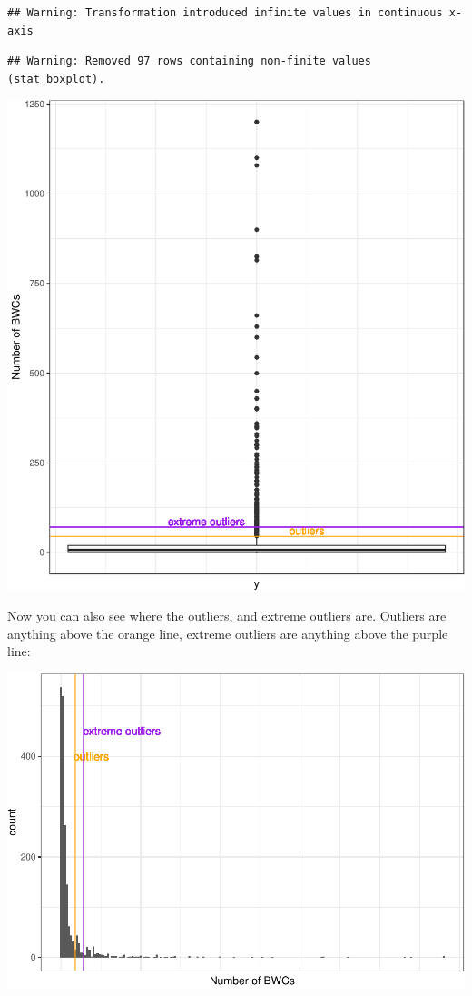 \documentclass[
]{book}
\begin{document}
\begin{verbatim}
## Warning: Transformation introduced infinite values in continuous x-axis
\end{verbatim}

\begin{verbatim}
## Warning: Removed 97 rows containing non-finite values (stat_boxplot).
\end{verbatim}

\includegraphics{04-descriptive-statistics_files/figure-latex/unnamed-chunk-29-1.pdf}

Now you can also see where the outliers, and extreme outliers are. Outliers are anything above the orange line, extreme outliers are anything above the purple line:

\includegraphics{04-descriptive-statistics_files/figure-latex/unnamed-chunk-30-1.pdf}
\end{document}
